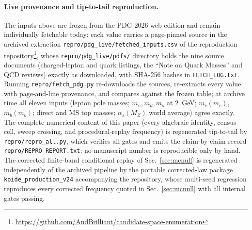 \documentclass[aps,twocolumn,superscriptaddress,nofootinbib,floatfix]{revtex4-2}
\newcommand{\MSbar}{\overline{\mathrm{MS}}}
\begin{document}
\paragraph{Live provenance and tip-to-tail reproduction.}
The inputs above are frozen from the PDG 2026 web edition and remain
individually fetchable today: each value carries a page-pinned source in the
archived extraction \texttt{repro/pdg\_live/fetched\_inputs.csv} of the
reproduction repository\footnote{\url{https://github.com/AndBrilliant/candidate-space-enumeration}},
whose \texttt{repro/pdg\_live/pdfs/} directory holds the nine source
documents (charged-lepton and quark listings, the ``Note on Quark Masses''
and QCD reviews) exactly as downloaded, with SHA-256 hashes in
\texttt{FETCH\_LOG.txt}. Running \texttt{repro/fetch\_pdg.py}
re-downloads the sources, re-extracts every value with page-and-line
provenance, and compares against the frozen table; at archive time all
eleven inputs (lepton pole masses; $m_u,m_d,m_s$ at $2$~GeV; $m_c(m_c)$,
$m_b(m_b)$; direct and $\MSbar$ top masses; $\alpha_s(M_Z)$ world average)
agree exactly. The complete numerical content of this paper (every
algebraic identity, census cell, sweep crossing, and procedural-replay
frequency) is regenerated tip-to-tail by \texttt{repro/repro\_all.py},
which verifies all gates and emits the claim-by-claim record
\texttt{repro/REPRO\_REPORT.txt}; no manuscript number is reproducible
only by hand. The corrected finite-band conditional replay of
Sec.~\ref{sec:mcnull} is regenerated independently of the archived pipeline
by the portable corrected-law package \texttt{koide\_production\_v24}
accompanying the repository, whose multi-seed regression reproduces every
corrected frequency quoted in Sec.~\ref{sec:mcnull} with all internal
gates passing.
\end{document}
